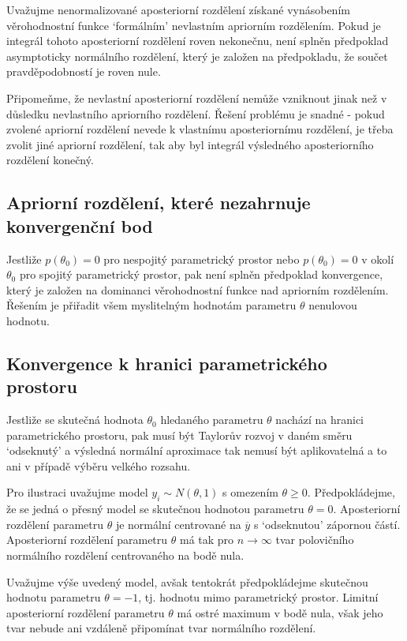 Uvažujme nenormalizované aposteriorní rozdělení získané vynásobením věrohodnostní funkce `formálním' nevlastním apriorním rozdělením. Pokud je integrál tohoto aposteriorní rozdělení roven nekonečnu, není splněn předpoklad asymptoticky normálního rozdělení, který je založen na předpokladu, že součet pravděpodobností je roven nule.

Připomeňme, že nevlastní aposteriorní rozdělení nemůže vzniknout jinak než v důsledku nevlastního apriorního rozdělení. Řešení problému je snadné - pokud zvolené apriorní rozdělení nevede k vlastnímu aposteriornímu rozdělení, je třeba zvolit jiné apriorní rozdělení, tak aby byl integrál výsledného aposteriorního rozdělení konečný.

\subsection{Apriorní rozdělení, které nezahrnuje konvergenční bod}

Jestliže $p(\theta_0) = 0$ pro nespojitý parametrický prostor nebo $p(\theta_0) = 0$ v okolí $\theta_0$ pro spojitý parametrický prostor, pak není splněn předpoklad konvergence, který je založen na dominanci věrohodnostní funkce nad apriorním rozdělením. Řešením je přiřadit všem myslitelným hodnotám parametru $\theta$ nenulovou hodnotu.

\subsection{Konvergence k hranici parametrického prostoru}

Jestliže se skutečná hodnota $\theta_0$ hledaného parametru $\theta$ nachází na hranici parametrického prostoru, pak musí být Taylorův rozvoj v daném směru `odseknutý' a výsledná normální aproximace tak nemusí být aplikovatelná a to ani v případě výběru velkého rozsahu.

Pro ilustraci uvažujme model $y_i \sim N(\theta, 1)$ s omezením $\theta \ge 0$. Předpokládejme, že se jedná o přesný model se skutečnou hodnotou parametru $\theta = 0$. Aposteriorní rozdělení parametru $\theta$ je normální centrované na $\overline{y}$ s `odseknutou' zápornou částí. Aposteriorní rozdělení parametru $\theta$ má tak pro $n \rightarrow \infty$ tvar polovičního normálního rozdělení centrovaného na bodě nula.

Uvažujme výše uvedený model, avšak tentokrát předpokládejme skutečnou hodnotu parametru $\theta = -1$, tj. hodnotu mimo parametrický prostor. Limitní aposteriorní rozdělení parametru $\theta$ má ostré maximum v bodě nula, však jeho tvar nebude ani vzdáleně připomínat tvar normálního rozdělení.

